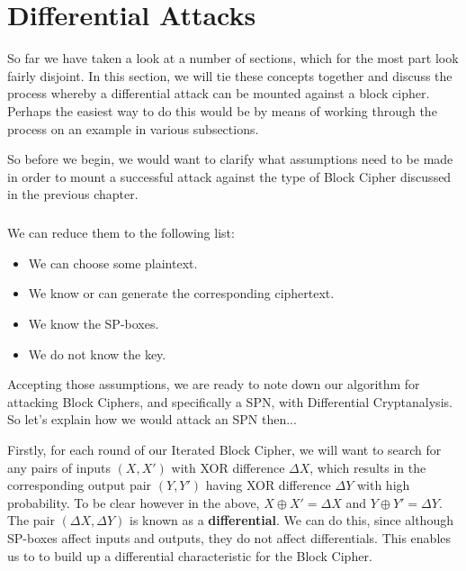 



\chapter{Differential Attacks} \label{c:differential attacks}

So far we have taken a look at a number of sections, which for the most part
look fairly disjoint. In this section, we will tie these concepts together and
discuss the process whereby a differential attack can be mounted against a
block cipher. Perhaps the easiest way to do this would be by means of working
through the process on an example in various subsections.

So before we begin, we would want to clarify what assumptions need to be made
in order to mount a successful attack against the type of Block Cipher
discussed in the previous chapter.
\paragraph{}

We can reduce them to the following list:
\begin{itemize}
\item We can choose some plaintext.
\item We know or can generate the corresponding ciphertext.
\item We know the SP-boxes. 
\item We do not know the key.
\end{itemize}

Accepting those assumptions, we are ready to note down our algorithm for
attacking Block Ciphers, and specifically a SPN, with Differential
Cryptanalysis. So let's explain how we would attack an SPN then...

Firstly, for each round of our Iterated Block Cipher, we will want to search
for any pairs of inputs $(X, X')$ with XOR difference $\Delta X$, which results
in the corresponding output pair $(Y, Y')$ having XOR difference $\Delta Y$
with high probability. To be clear however in the above, $X \oplus X' =
\Delta X$ and $Y \oplus Y' = \Delta Y$. The pair $(\Delta X, \Delta Y)$ is
known as a \textbf{differential}. We can do this, since although SP-boxes affect
inputs and outputs, they do not affect differentials. This enables us to to build up a
differential characteristic for the Block Cipher. 

